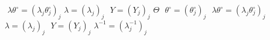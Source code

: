 \stopmpxshipout
\mpxshipout%
$ $%
\stopmpxshipout
\mpxshipout%
$\lambda\theta^\circ=(\lambda_j\theta^\circ_j)_j$%
\stopmpxshipout
\mpxshipout%
$\lambda=(\lambda_j)_j$%
\stopmpxshipout
\mpxshipout%
$ $%
\stopmpxshipout
\mpxshipout%
$Y=(Y_j)_j$%
\stopmpxshipout
\mpxshipout%
$\Theta$%
\stopmpxshipout
\mpxshipout%
$ $%
\stopmpxshipout
\mpxshipout%
$\theta^\circ=(\theta^\circ_j)_j$%
\stopmpxshipout
\mpxshipout%
$ $%
\stopmpxshipout
\mpxshipout%
$\lambda\theta^\circ=(\lambda_j\theta^\circ_j)_j$%
\stopmpxshipout
\mpxshipout%
$\lambda=(\lambda_j)_j$%
\stopmpxshipout
\mpxshipout%
$ $%
\stopmpxshipout
\mpxshipout%
$Y=(Y_j)_j$%
\stopmpxshipout
\mpxshipout%
$\lambda^{-1}=(\lambda_j^{-1})_j$%
\stopmpxshipout

